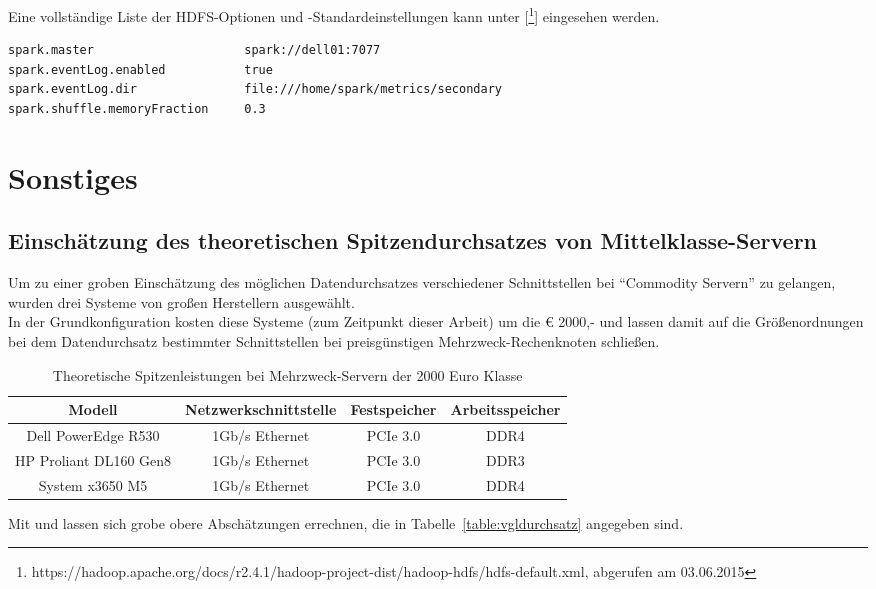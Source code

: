 \begin{appendices}
Eine vollständige Liste der HDFS-Optionen und -Standardeinstellungen kann unter [\footnote{https://hadoop.apache.org/docs/r2.4.1/hadoop-project-dist/hadoop-hdfs/hdfs-default.xml, abgerufen am 03.06.2015}] eingesehen werden.

\begin{lstlisting}[caption={spark-defaults.conf (Auszug)},label={lst:hdfs_config}]
spark.master                     spark://dell01:7077
spark.eventLog.enabled           true
spark.eventLog.dir               file:///home/spark/metrics/secondary
spark.shuffle.memoryFraction     0.3
\end{lstlisting}

\section{Sonstiges}
\subsection{Einschätzung des theoretischen Spitzendurchsatzes von Mittelklasse-Servern}
\label{subsec:commodity_servers}
Um zu einer groben Einschätzung des möglichen Datendurchsatzes verschiedener Schnittstellen bei "`Commodity Servern"' zu gelangen, wurden drei Systeme von großen Herstellern ausgewählt.\\
In der Grundkonfiguration kosten diese Systeme (zum Zeitpunkt dieser Arbeit) um die € 2000,- und lassen damit auf die Größenordnungen bei dem Datendurchsatz bestimmter Schnittstellen bei preisgünstigen Mehrzweck-Rechenknoten schließen.

\begin{table}[ht]
	\centering %
	\begin{tabular}{c c c c} %
		\hline\hline %
		Modell & Netzwerkschnittstelle & Festspeicher & Arbeitsspeicher\\ [0.5ex] %
		\hline %
		Dell PowerEdge R530 & 1Gb/s Ethernet & PCIe 3.0 & DDR4\\ 
		HP Proliant DL160 Gen8 & 1Gb/s Ethernet & PCIe 3.0 & DDR3\\ 
		System x3650 M5 & 1Gb/s Ethernet & PCIe 3.0 & DDR4\\ %
		\hline %
	\end{tabular}
	\caption{Theoretische Spitzenleistungen bei Mehrzweck-Servern der 2000 Euro Klasse} %
	\label{table:vglinterfaces} %
\end{table}

Mit \cite{PCI14} und \cite{Fuj11} lassen sich grobe obere Abschätzungen errechnen, die in Tabelle~\ref{table:vgldurchsatz} angegeben sind.

\end{appendices}